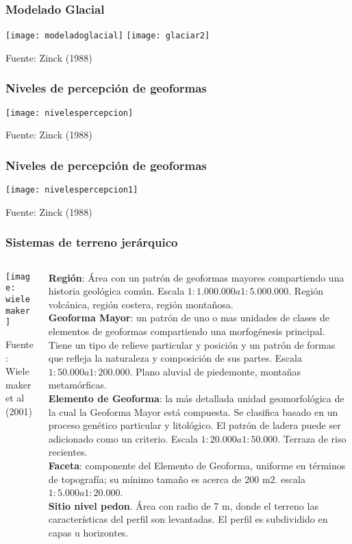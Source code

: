 \documentclass{beamer}
\begin{document}
\begin{frame}
\frametitle{Modelado Glacial}
\begin{center}
	\texttt{[image: modeladoglacial]}
   	\texttt{[image: glaciar2]}
\end{center}
\tiny{Fuente: Zinck (1988)}
\end{frame}
\begin{frame}
\frametitle{Niveles de percepción de geoformas}
\begin{center}
	\texttt{[image: nivelespercepcion]}
\end{center}
\tiny{Fuente: Zinck (1988)}
\end{frame}
\begin{frame}
\frametitle{Niveles de percepción de geoformas}
\begin{center}
	\texttt{[image: nivelespercepcion1]}
\end{center}
\tiny{Fuente: Zinck (1988)}
\end{frame}
\begin{frame}
\frametitle{Sistemas de terreno jerárquico}
\begin{columns}
\begin{column}{0.4\textwidth}
\begin{center}
	\texttt{[image: wielemaker]}
\end{center}
\tiny{Fuente: Wielemaker et al (2001)}
\end{column}
\begin{column}{0.6\textwidth}
	\scriptsize{\textbf{Región}: Área con un patrón de geoformas mayores compartiendo una historia geológica común. Escala $1:1.000.000 a 1: 5.000.000$. Región volcánica, región costera, región montañosa.\\
\textbf{Geoforma Mayor}: un patrón de uno o mas unidades de clases de elementos de geoformas compartiendo una morfogénesis principal. Tiene un tipo de relieve particular y posición y un patrón de formas que refleja la naturaleza y composición de sus partes. Escala $1:50.000 a 1: 200.000$. Plano aluvial de piedemonte, montañas metamórficas.\\
\textbf{Elemento de Geoforma}: la más detallada unidad geomorfológica de la cual la Geoforma Mayor está compuesta. Se clasifica basado en un proceso genético particular y litológico. El patrón de ladera puede ser adicionado como un criterio. Escala $1: 20.000 a 1: 50.000$. Terraza de riso recientes.\\
\textbf{Faceta}: componente del Elemento de Geoforma, uniforme en términos de topografía; su mínimo tamaño es acerca de 200 m2. escala $1:5.000 a 1:20.000$.\\
\textbf{Sitio nivel pedon}. Área con radio de 7 m, donde el terreno las características del perfil son levantadas. El perfil es subdividido en capas u horizontes.
}
\end{column}
\end{columns}
\end{frame}
\end{document}
